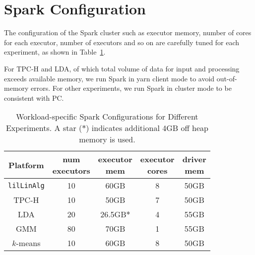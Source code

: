 \section{Spark Configuration}
\label{sec:spark}

The configuration of the Spark cluster such as
executor memory, number of cores for each executor, number of
executors and so on are carefully tuned for each
experiment, as shown in Table~\ref{fig:sparkConf}.

For TPC-H and LDA, of which total volume of data for input and
processing exceeds available memory, we run Spark in yarn client
mode to avoid out-of-memory errors. For other experiments, we run Spark
in cluster mode to be consistent with PC.

\begin{table}[H]
\begin{center}
\begin{tabular}{|c||c|c|c|c|}
\hline
Platform & \makecell{num\\executors} & \makecell{executor \\mem} & \makecell{executor \\cores}& \makecell{driver \\mem}\\
\hline
\texttt{lilLinAlg} &10 & 60GB & 8 & 50GB \\
TPC-H &10 & 50GB & 7 & 50GB \\
LDA &20 & 26.5GB$*$ &4 & 55GB\\
GMM&80 & 70GB & 1 & 55GB\\
$k$-means &10 &60GB & 8 & 50GB\\
\hline
\end{tabular}
\caption{Workload-specific Spark Configurations for Different
  Experiments. A star ($*$) indicates additional 4GB off heap memory is used.}
\label{fig:sparkConf}
\end{center}
\end{table}
